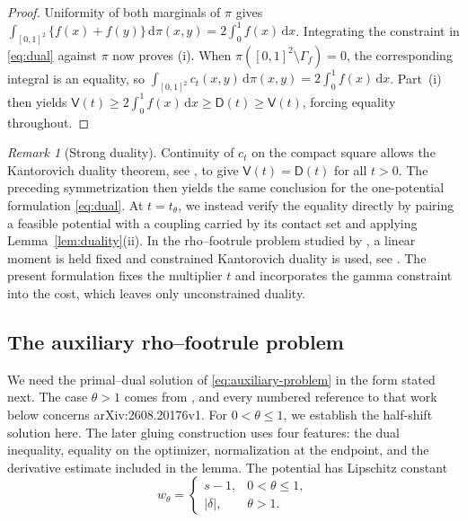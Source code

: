 \documentclass{article}
\theoremstyle{definition}
\theoremstyle{remark}
\newtheorem{remark}[theorem]{Remark}
\newcommand{\1}{\mathds{1}}
\newcommand{\de}{\,\mathrm{d}}
\newcommand{\I}{[0,1]}
\begin{document}
\begin{proof}
	Uniformity of both marginals of $\pi$ gives $\int_{\I^2}\{f(x)+f(y)\}\de\pi(x,y)=2\int_0^1f(x)\de x$. Integrating the constraint in \eqref{eq:dual} against $\pi$ now proves (i).
	When $\pi(\I^2\setminus\Gamma_f)=0$, the corresponding integral is an equality, so $\int_{\I^2}c_t(x,y)\de\pi(x,y)=2\int_0^1f(x)\de x$. Part~(i) then yields $\mathsf V(t)\ge2\int_0^1f(x)\de x\ge\mathsf D(t)\ge\mathsf V(t)$, forcing equality throughout.
\end{proof}

\begin{remark}[Strong duality]\label{rem:strong-duality}
	Continuity of $c_t$ on the compact square allows the Kantorovich duality theorem, see \citet[Thm.~5.10]{villani2009optimal}, to give $\mathsf V(t)=\mathsf D(t)$ for all $t>0$. The preceding symmetrization then yields the same conclusion for the one-potential formulation \eqref{eq:dual}.
	At $t=t_\theta$, we instead verify the equality directly by pairing a feasible potential with a coupling carried by its contact set and applying Lemma~\ref{lem:duality}(ii).
	In the rho--footrule problem studied by \citet{ansari2026exact}, a linear moment is held fixed and constrained Kantorovich duality is used, see \citet[Thm.~2.1]{zaev2015monge}. The present formulation fixes the multiplier $t$ and incorporates the gamma constraint into the cost, which leaves only unconstrained duality.
\end{remark}

\subsection{The auxiliary rho--footrule problem}\label{sec:input}

We need the primal--dual solution of \eqref{eq:auxiliary-problem} in the
form stated next. The case $\theta>1$ comes from \citet{ansari2026exact},
and every numbered reference to that work below concerns
arXiv:2608.20176v1. For $0<\theta\le1$, we establish the half-shift solution
here. The later gluing construction uses four features: the dual inequality,
equality on the optimizer, normalization at the endpoint, and the derivative
estimate included in the lemma.
The potential has Lipschitz constant
\begin{equation}\label{eq:lipschitz-parameter}
w_\theta=\begin{cases}s-1,&0<\theta\le1,\\ |\delta|,&\theta>1.\end{cases}
\end{equation}
\end{document}
